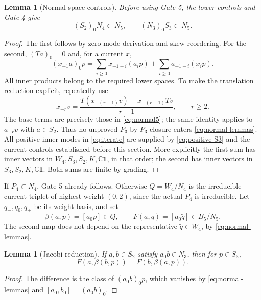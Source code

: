 \documentclass[11pt,a4paper]{article}
\newtheorem{lemma}[theorem]{Lemma}
\theoremstyle{definition}
\newcommand{\CC}{\mathbb C}
\newcommand{\one}{\mathbf1}
\begin{document}
\begin{lemma}[Normal-space controls]\label{lem:normal-controls}
Before using Gate 5, the lower controls and Gate 4 give
\begin{equation}\label{eq:normal-lemmas}
 (S_2)_0N_4\subset N_5,\qquad (N_3)_0S_3\subset N_5.
\end{equation}
\end{lemma}
\begin{proof}
The first follows by zero-mode derivation and skew reordering. For the
second, \((Ta)_0=0\) and, for a current \(x\),
\begin{equation}\label{eq:iterate}
 (x_{-1}a)_0p
 =\sum_{i\geq0}x_{-1-i}(a_ip)
  +\sum_{i\geq0}a_{-1-i}(x_ip).
\end{equation}
All inner products belong to the required lower spaces. To make the
translation reduction explicit, repeatedly use
\[
 x_{-r}v=\frac{T(x_{-(r-1)}v)-x_{-(r-1)}Tv}{r-1},\qquad r\geq2.
\]
The base terms are precisely those in \eqref{eq:normal5}; the same
identity applies to \(a_{-r}v\) with \(a\in S_2\). Thus no
unproved \(P_3\)-by-\(P_3\) closure enters \eqref{eq:normal-lemmas}.
All positive inner modes in \eqref{eq:iterate} are supplied by
\eqref{eq:positive-S3} and the current controls established before
this section. More explicitly the first sum has inner vectors in
$W_4,S_3,S_2,K,\CC\one$, in that order; the second has inner
vectors in $S_3,S_2,K,\CC\one$. Both sums are finite by grading.
\end{proof}

If \(P_4\subset N_4\), Gate 5 already follows. Otherwise
\(Q=W_4/N_4\) is the irreducible current triplet of highest weight
\((0,2)\), since the actual \(P_4\) is irreducible. Let
\(q_-,q_0,q_+\) be its weight basis, and set
\[
 \beta(a,p)=[a_0p]\in Q,\qquad
 F(a,q)=[a_0\widetilde q]\in B_5/N_5.
\]
The second map does not depend on the representative
\(\widetilde q\in W_4\), by \eqref{eq:normal-lemmas}.

\begin{lemma}[Jacobi reduction]\label{lem:jacobi}
If \(a,b\in S_2\) satisfy \(a_0b\in N_3\), then for \(p\in S_3\),
\begin{equation}\label{eq:jacobi-reduction}
 F(a,\beta(b,p))=F(b,\beta(a,p)).
\end{equation}
\end{lemma}
\begin{proof}
The difference is the class of \((a_0b)_0p\), which vanishes by
\eqref{eq:normal-lemmas} and \([a_0,b_0]=(a_0b)_0\).
\end{proof}
\end{document}
